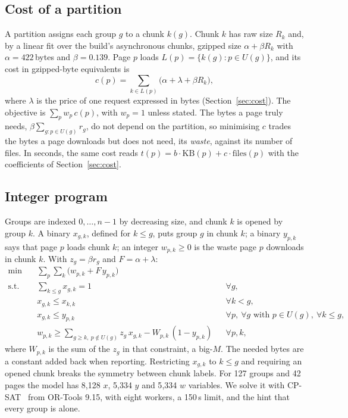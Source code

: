 \documentclass[11pt]{article}
\begin{document}
\subsection{Cost of a partition}\label{sec:cost-def}
A partition assigns each group $g$ to a chunk $k(g)$. Chunk $k$ has raw size $R_k$ and, by a linear fit over the build's asynchronous chunks, gzipped size $\alpha + \beta R_k$ with $\alpha = 422$\,bytes and $\beta = 0.139$. Page $p$ loads $L(p) = \{k(g) : p \in U(g)\}$, and its cost in gzipped-byte equivalents is
\[
c(p) = \sum_{k \in L(p)} \bigl(\alpha + \lambda + \beta R_k\bigr),
\]
where $\lambda$ is the price of one request expressed in bytes (Section~\ref{sec:cost}). The objective is $\sum_{p} w_p\, c(p)$, with $w_p = 1$ unless stated. The bytes a page truly needs, $\beta \sum_{g : p \in U(g)} r_g$, do not depend on the partition, so minimising $c$ trades the bytes a page downloads but does not need, its \emph{waste}, against its number of files. In seconds, the same cost reads $t(p) = b \cdot \mathrm{KB}(p) + c \cdot \mathrm{files}(p)$ with the coefficients of Section~\ref{sec:cost}.

\subsection{Integer program}
Groups are indexed $0, \dots, n-1$ by decreasing size, and chunk $k$ is opened by group $k$. A binary $x_{g,k}$, defined for $k \le g$, puts group $g$ in chunk $k$; a binary $y_{p,k}$ says that page $p$ loads chunk $k$; an integer $w_{p,k} \ge 0$ is the waste page $p$ downloads in chunk $k$. With $z_g = \beta r_g$ and $F = \alpha + \lambda$:
\begin{align*}
\min \quad & \textstyle\sum_{p}\sum_{k} \bigl(w_{p,k} + F\, y_{p,k}\bigr) &&\\
\text{s.t.} \quad & \textstyle\sum_{k \le g} x_{g,k} = 1 && \forall g,\\
& x_{g,k} \le x_{k,k} && \forall k < g,\\
& x_{g,k} \le y_{p,k} && \forall p,\ \forall g \text{ with } p \in U(g),\ \forall k \le g,\\
& w_{p,k} \ge \textstyle\sum_{g \ge k,\ p \notin U(g)} z_g\, x_{g,k} - W_{p,k}\,(1 - y_{p,k}) && \forall p, k,
\end{align*}
where $W_{p,k}$ is the sum of the $z_g$ in that constraint, a big-$M$. The needed bytes are a constant added back when reporting. Restricting $x_{g,k}$ to $k \le g$ and requiring an opened chunk breaks the symmetry between chunk labels. For 127 groups and 42 pages the model has 8{,}128 $x$, 5{,}334 $y$ and 5{,}334 $w$ variables. We solve it with CP-SAT~\cite{cpsat,cpsatlp} from OR-Tools 9.15, with eight workers, a 150\,s limit, and the hint that every group is alone.
\end{document}
